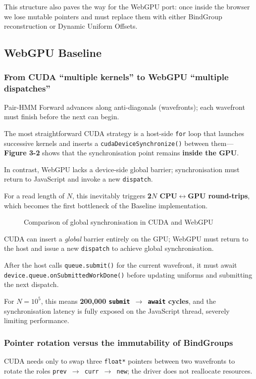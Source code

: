 \documentclass[12pt]{report}
\begin{document}
This structure also paves the way for the WebGPU port: once inside the browser we lose mutable pointers and must replace them with either BindGroup reconstruction or Dynamic Uniform Offsets.

\subsection{WebGPU Baseline}
\subsubsection{From CUDA ``multiple kernels'' to WebGPU ``multiple dispatches''}
Pair-HMM Forward advances along anti-diagonals (wavefronts); each wavefront must finish before the next can begin.

The most straightforward CUDA strategy is a host-side \texttt{for} loop that launches successive kernels and inserts a \texttt{cudaDeviceSynchronize()} between them—\textbf{Figure 3-2} shows that the synchronisation point remains \textbf{inside the GPU}.

In contrast, WebGPU lacks a device-side global barrier; synchronisation must return to JavaScript and invoke a new \texttt{dispatch}.

For a read length of $N$, this inevitably triggers \textbf{2$N$ CPU$\leftrightarrow$GPU round-trips}, which becomes the first bottleneck of the Baseline implementation.

\begin{figure}[h]
    \caption{Comparison of global synchronisation in CUDA and WebGPU}
    \label{fig:global_sync}
\end{figure}

CUDA can insert a \emph{global} barrier entirely on the GPU; WebGPU must return to the host and issue a new \texttt{dispatch} to achieve global synchronisation.

After the host calls \texttt{queue.submit()} for the current wavefront, it must await \texttt{device.queue.onSubmittedWorkDone()} before updating uniforms and submitting the next dispatch.

For $N=10^5$, this means \textbf{200,000 \texttt{submit $\rightarrow$ await} cycles}, and the synchronisation latency is fully exposed on the JavaScript thread, severely limiting performance.

\subsubsection{Pointer rotation versus the immutability of BindGroups}
CUDA needs only to swap three \texttt{float*} pointers between two wavefronts to rotate the roles \texttt{prev $\rightarrow$ curr $\rightarrow$ new}; the driver does not reallocate resources.
\end{document}
